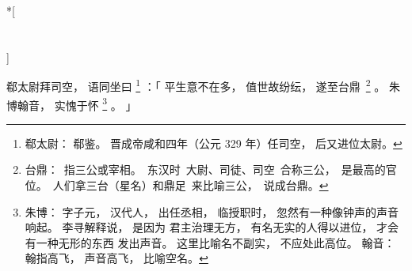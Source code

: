 
\switchcolumn[0]*[\section{}]

郗太尉拜司空，
语同坐曰%
\footnote{%
    郗太尉：
        郗鉴。
        晋成帝咸和四年（公元 329 年）任司空，
        后又进位太尉。
}%
：「
    平生意不在多，
    值世故纷纭，
    遂至台\mbox{鼎%
    \footnote{%
        台鼎：
            指三公或宰相。
            东汉时
            大尉、司徒、司空
            合称三公，
            是最高的官位。
            人们拿三台（星名）和鼎足
            来比喻三公，
            说成台鼎。
    }}%
    。
    朱博翰音，
    实愧于怀%
    \footnote{%
        朱博：
            字子元，
            汉代人，
            出任丞相，
            临授职时，
            忽然有一种像钟声的声音响起。
            李寻解释说，
            是因为
            君主治理无方，
            有名无实的人得以进位，
            才会有一种无形的东西
            发出声音。
            这里比喻名不副实，
            不应处此高位。
        翰音：
            翰指高飞，
            声音高飞，
            比喻空名。
    }%
    。
」

\switchcolumn


